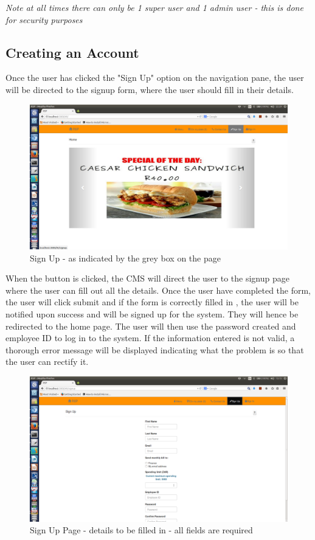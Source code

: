 \documentclass[a4paper,12pt]{report}
\begin{document}
{\em* Note at all times there can only be 1 super user and 1 admin user - this is done for security purposes  } \\
 

\subsection{Creating an Account} 
Once the user has clicked the "Sign Up" option on the navigation pane, the user will be directed to the signup form, where the user should fill in their details. 

\begin{figure}[H]
  \centering
    \includegraphics[width=1.0\textwidth]{screenshots/sign/signUp.png}
    \caption{Sign Up - as indicated by the grey box on the page} 
\end{figure}

When the button is clicked, the CMS will direct the user to the signup page where the user can fill out all the details. Once the user have completed the form, the user will click submit and if the form is correctly filled in , the user will be notified upon success and will be signed up for the system. They will hence be redirected to the home page. The user will then use the password created and employee ID to log in to the system. If the information entered is not valid, a thorough error message will be displayed indicating what the problem is so that the user can rectify it.

\begin{figure}[H]
  \centering
    \includegraphics[width=1.0\textwidth]{screenshots/sign/signUpPage.png}
    \caption{Sign Up Page - details to be filled in - all fields are required} 
\end{figure}
\end{document}
